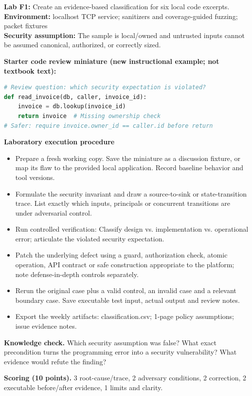 \documentclass[10pt,letterpaper]{article}
\begin{document}
\begin{insight}\textbf{Lab F1:} Create an evidence-based classification for six local code excerpts.\\\textbf{Environment:} localhost TCP service; sanitizers and coverage-guided fuzzing; packet fixtures\\\textbf{Security assumption:} The sample is local/owned and untrusted inputs cannot be assumed canonical, authorized, or correctly sized.\end{insight}
\textbf{Starter code review miniature (new instructional example; not textbook text):}
\begin{lstlisting}[language=Python]
# Review question: which security expectation is violated?
def read_invoice(db, caller, invoice_id):
    invoice = db.lookup(invoice_id)
    return invoice  # Missing ownership check
# Safer: require invoice.owner_id == caller.id before return
\end{lstlisting}
\textbf{Laboratory execution procedure}
\begin{itemize}[leftmargin=*,itemsep=2pt]
\item Prepare a fresh working copy. Save the miniature as a discussion fixture, or map its flaw to the provided local application. Record baseline behavior and tool versions.
\item Formulate the security invariant and draw a source-to-sink or state-transition trace. List exactly which inputs, principals or concurrent transitions are under adversarial control.
\item Run controlled verification: Classify design vs. implementation vs. operational error; articulate the violated security expectation.
\item Patch the underlying defect using a guard, authorization check, atomic operation, API contract or safe construction appropriate to the platform; note defense-in-depth controls separately.
\item Rerun the original case plus a valid control, an invalid case and a relevant boundary case. Save executable test input, actual output and review notes.
\item Export the weekly artifacts: classification.csv; 1-page policy assumptions; issue evidence notes.
\end{itemize}
\textbf{Knowledge check.} Which security assumption was false? What exact precondition turns the programming error into a security vulnerability? What evidence would refute the finding?

\textbf{Scoring (10 points).} 3 root-cause/trace, 2 adversary conditions, 2 correction, 2 executable before/after evidence, 1 limits and clarity.
\end{document}
